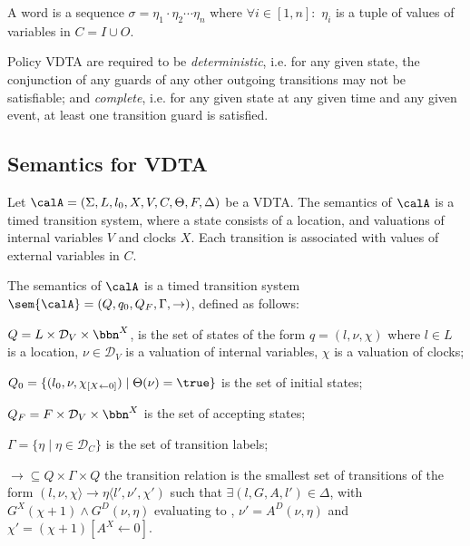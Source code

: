 A word is a sequence $\sigma = \eta_1\cdot \eta_2 \cdots \eta_n$ where $\forall i \in [1,n]:$ $\eta_i$ is a tuple of values of variables in $C = I \cup O$. 

Policy \ac{VDTA} are required to be \textit{deterministic}, i.e. for any given state, the conjunction of any guards of any other outgoing transitions may not be satisfiable; and \textit{complete}, i.e. for any given state at any given time and any given event, at least one transition guard is satisfied.

\subsection{Semantics for \ac{VDTA}}

Let $\calA = \left(\Sigma, L, {l_0}, X, V, C, \Theta, F,  \Delta \right)$  be a VDTA.
The semantics of $\calA$ is a timed transition system,
where a state consists of a location, and valuations of internal variables $V$ and clocks $X$.
Each transition is associated with values of external variables in $C$.

\begin{definition}
	\label{def:vdta:semantics}
	The semantics of $\calA$ is a timed transition system $\sem{\calA}=( Q, q_0, Q_F, \Gamma, \to )$, defined as follows:
	\squishlist
	\item $Q = L \times {\mathcal D}_V \times \bbn^X$, is the set of states of the form $q= ( l,\nu ,\chi )$ where
	$l \in L$ is a location,
	$\nu \in {\mathcal D}_V$ is a valuation of internal variables,
	$\chi$ is a valuation of clocks;
	\item $Q_0 = \{ ( l_0,\nu, \chi_{[X \leftarrow 0]} )  \mid \Theta(\nu)=\true \}$ is the set of initial states;
	\item $Q_F = F \times {\mathcal D}_V \times \bbn^X$ is the set of accepting states;
	\item $\Gamma = \{ \eta \mid
	\eta \in {\mathcal D}_{C}  \}$ is the set of transition labels;
	\item $\to\subseteq Q\times \Gamma\times Q$  the transition relation
	is the smallest set of transitions of the form
	$( l,\nu,\chi \rangle \longrightarrow {\eta} \langle l',\nu',\chi')$
	such that  $\exists ( l, G, A, l' ) \in \Delta$,
	with $G^X(\chi + 1) \wedge G^D(\nu, \eta) $ evaluating to {\true},
	$\nu'= A^D(\nu, \eta)$ and $\chi'=(\chi+1)[A^X \leftarrow 0]$.
	\squishend
\end{definition}


